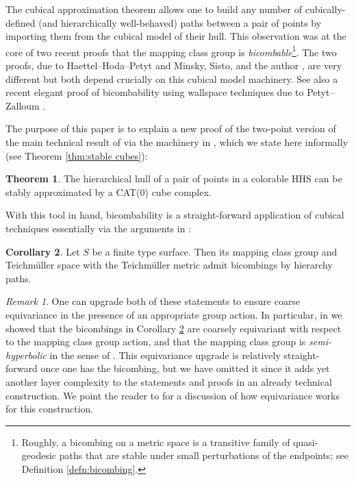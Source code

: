 \documentclass{amsart}
\theoremstyle{definition}
\theoremstyle{remark}
\newtheorem{remark}[theorem]{Remark}
\theoremstyle{definition}
\newtheorem{thmi}{Theorem}
\newtheorem{cori}[thmi]{Corollary}
\begin{document}
The cubical approximation theorem allows one to build any number of cubically-defined (and hierarchically well-behaved) paths between a pair of points by importing them from the cubical model of their hull.  This observation was at the core of two recent proofs that the mapping class group is \emph{bicombable}\footnote{Roughly, a bicombing on a metric space is a transitive family of quasi-geodesic paths that are stable under small perturbations of the endpoints; see Definition \ref{defn:bicombing}.}.  The two proofs, due to Haettel--Hoda--Petyt \cite{HHP} and Minsky, Sisto, and the author \cite{DMS_bary}, are very different but both depend crucially on this cubical model machinery.  See also a recent elegant proof of bicombability using wallspace techniques due to Petyt--Zalloum \cite{PZ_walls}.

The purpose of this paper is to explain a new proof of the two-point version of the main technical result of \cite{DMS_bary} via the machinery in \cite{Dur_infcube}, which we state here informally (see Theorem \ref{thm:stable cubes}):

\begin{thmi}\label{thmi:main}
The hierarchical hull of a pair of points in a colorable HHS can be stably approximated by a CAT(0) cube complex.
\end{thmi}

With this tool in hand, bicombability is a straight-forward application of cubical techniques essentially via the arguments in  \cite[Sections 5 and 6]{DMS_bary}:

\begin{cori}\label{cori:semihyp}
Let $S$ be a finite type surface.  Then its mapping class group and Teichm\"uller space with the Teichm\"uller metric admit bicombings by hierarchy paths.
\end{cori}


\begin{remark}
One can upgrade both of these statements to ensure coarse equivariance in the presence of an appropriate group action.  In particular, in \cite{DMS_bary} we showed that the bicombings in Corollary \ref{cori:semihyp} are coarsely equivariant with respect to the mapping class group action, and that the mapping class group is \emph{semi-hyperbolic} in the sense of \cite{AB95}.  This equivariance upgrade is relatively straight-forward once one has the bicombing, but we have omitted it since it adds yet another layer complexity to the statements and proofs in an already technical construction.  We point the reader to \cite[Remark 2]{DMS_bary} for a discussion of how equivariance works for this construction. 
\end{remark}
\end{document}
